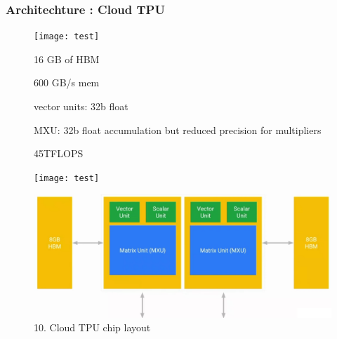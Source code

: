 \documentclass[c]{beamer}
\begin{document}
  \begin{frame} [c]
  \frametitle{Architechture : Cloud TPU}
			\begin{figure}[ht]
  {\begin{minipage}[t]{120pt}
    \texttt{[image: test]}
    	\begin{itemize}
		\justifying
		{\small \item16 GB of HBM
\item 600 GB/s mem
\item vector units: 32b float
\item MXU: 32b float accumulation but reduced precision for multipliers
\item 45TFLOPS
	}

		\end{itemize}		
  \end{minipage}}
  \hfill
  {\begin{minipage}[t]{215pt}
    \texttt{[image: test]}
    
                \includegraphics[scale=.255]{images/10chiplayout.png}
            \caption
            {10. Cloud TPU chip layout}
            \label{fig: cloud TPU chip layout}
        
  \end{minipage}}
\end{figure}
  \end{frame}
  
\end{document}
